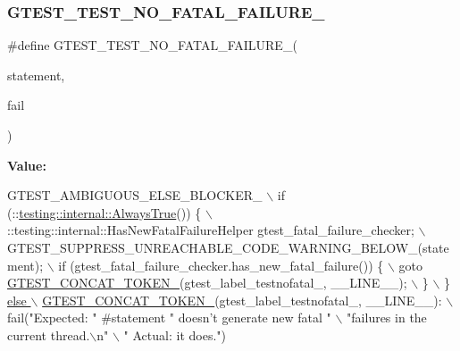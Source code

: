 \mbox{\label{gtest-internal_8h_a1b37a3c446836d33040f3266a6236081}} 
\subsubsection{\texorpdfstring{G\+T\+E\+S\+T\+\_\+\+T\+E\+S\+T\+\_\+\+N\+O\+\_\+\+F\+A\+T\+A\+L\+\_\+\+F\+A\+I\+L\+U\+R\+E\+\_\+}{GTEST\_TEST\_NO\_FATAL\_FAILURE\_}}
{\footnotesize\ttfamily \#define G\+T\+E\+S\+T\+\_\+\+T\+E\+S\+T\+\_\+\+N\+O\+\_\+\+F\+A\+T\+A\+L\+\_\+\+F\+A\+I\+L\+U\+R\+E\+\_\+(\begin{DoxyParamCaption}\item[{}]{statement,  }\item[{}]{fail }\end{DoxyParamCaption})}

{\bfseries Value\+:}
\begin{DoxyCode}
GTEST\_AMBIGUOUS\_ELSE\_BLOCKER\_ \(\backslash\)
  if (::\hyperlink{namespacetesting_1_1internal_a4d46f09c3bfe68700b7f728d2cc3782f}{testing::internal::AlwaysTrue}()) \{ \(\backslash\)
    ::testing::internal::HasNewFatalFailureHelper gtest\_fatal\_failure\_checker; \(\backslash\)
    GTEST\_SUPPRESS\_UNREACHABLE\_CODE\_WARNING\_BELOW\_(statement); \(\backslash\)
    if (gtest\_fatal\_failure\_checker.has\_new\_fatal\_failure()) \{ \(\backslash\)
      goto \hyperlink{gtest-internal_8h_ae3c336cbe1ae2bd1b1d019333e4428a0}{GTEST\_CONCAT\_TOKEN\_}(gtest\_label\_testnofatal\_, \_\_LINE\_\_); \(\backslash\)
    \} \(\backslash\)
  \} \hyperlink{gtest-internal_8h_ae3c336cbe1ae2bd1b1d019333e4428a0}{else \(\backslash\)}
\hyperlink{gtest-internal_8h_ae3c336cbe1ae2bd1b1d019333e4428a0}{    GTEST\_CONCAT\_TOKEN\_}(gtest\_label\_testnofatal\_, \_\_LINE\_\_): \(\backslash\)
      fail(\textcolor{stringliteral}{"Expected: "} #statement \textcolor{stringliteral}{" doesn't generate new fatal "} \(\backslash\)
           \textcolor{stringliteral}{"failures in the current thread.\(\backslash\)n"} \(\backslash\)
           \textcolor{stringliteral}{"  Actual: it does."})
\end{DoxyCode}
\mbox{\label{gtest-internal_8h_a9a109d026b5a904646437d7570e13581}} 

